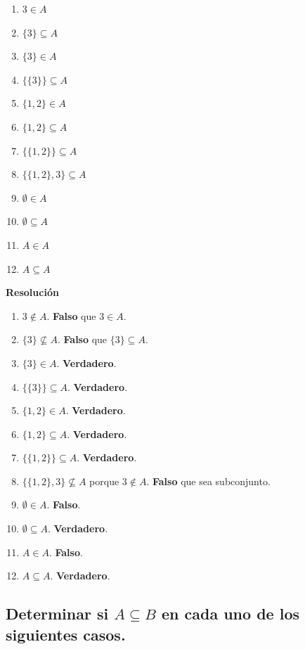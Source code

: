 \documentclass[11pt]{article}
\begin{document}
\begin{multicols}{2}
\begin{enumerate}[label=\roman*)]
    \item \(3 \in A\)
    \item \(\{3\} \subseteq A\)
    \item \(\{3\} \in A\)
    \item \(\{\{3\}\} \subseteq A\)
    \item \(\{1,2\} \in A\)
    \item \(\{1,2\} \subseteq A\)
    \item \(\{\{1,2\}\} \subseteq A\)
    \item \(\{\{1,2\}, 3\} \subseteq A\)
    \item \(\emptyset \in A\)
    \item \(\emptyset \subseteq A\)
    \item \(A \in A\)
    \item \(A \subseteq A\)
\end{enumerate}
\end{multicols}

\textbf{Resolución}
\begin{enumerate}[label=\roman*)]
    \item \(3 \notin A\). \textbf{Falso} que \(3 \in A\).
    \item \(\{3\} \not\subseteq A\). \textbf{Falso} que \(\{3\}\subseteq A\).
    \item \(\{3\} \in A\). \textbf{Verdadero}.
    \item \(\{\{3\}\} \subseteq A\). \textbf{Verdadero}.
    \item \(\{1,2\} \in A\). \textbf{Verdadero}.
    \item \(\{1,2\} \subseteq A\). \textbf{Verdadero}.
    \item \(\{\{1,2\}\} \subseteq A\). \textbf{Verdadero}.
    \item \(\{\{1,2\},3\} \not\subseteq A\) porque \(3\notin A\). \textbf{Falso} que sea subconjunto.
    \item \(\emptyset \in A\). \textbf{Falso}.
    \item \(\emptyset \subseteq A\). \textbf{Verdadero}.
    \item \(A \in A\). \textbf{Falso}.
    \item \(A \subseteq A\). \textbf{Verdadero}.
\end{enumerate}

\subsection{Determinar si \(A \subseteq B\) en cada uno de los siguientes casos.}
\end{document}
